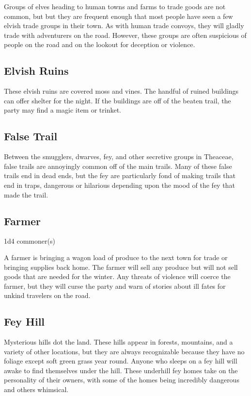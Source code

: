 Groups of elves heading to human towns and farms to trade goods are not common, but but they are frequent enough that most people have seen a few elvish trade groups in their town.
As with human trade convoys, they will gladly trade with adventurers on the road.
However, these groups are often suspicious of people on the road and on the lookout for deception or violence.

\subsection{Elvish Ruins}

These elvish ruins are covered moss and vines.
The handful of ruined buildings can offer shelter for the night.
If the buildings are off of the beaten trail, the party may find a magic item or trinket.

\subsection{False Trail}

Between the smugglers, dwarves, fey, and other secretive groups in Theaceae, false trails are annoyingly common off of the main trails.
Many of these false trails end in dead ends, but the fey are particularly fond of making trails that end in traps, dangerous or hilarious depending upon the mood of the fey that made the trail.

\subsection{Farmer}

1d4 commoner(s)

A farmer is bringing a wagon load of produce to the next town for trade or bringing supplies back home.
The farmer will sell any produce but will not sell goods that are needed for the winter.
Any threats of violence will coerce the farmer, but they will curse the party and warn of stories about ill fates for unkind travelers on the road.

\subsection{Fey Hill}

Mysterious hills dot the land.
These hills appear in forests, mountains, and a variety of other locations, but they are always recognizable because they have no foliage except soft green grass year round.
Anyone who sleeps on a fey hill will awake to find themselves under the hill.
These underhill fey homes take on the personality of their owners, with some of the homes being incredibly dangerous and others whimsical.

